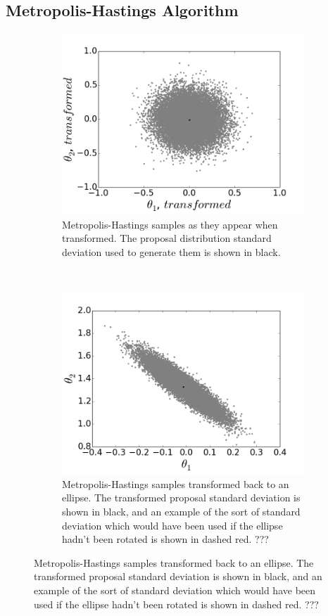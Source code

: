 \documentclass[a4paper,11pt,twoside]{article}
\begin{document}
\subsection{Metropolis-Hastings Algorithm} 
\begin{figure}[htb]
	\centering
	\begin{subfigure}[t]{0.4\linewidth}
		\centering
		\includegraphics[width=\textwidth]{rot.png}
		\caption{Metropolis-Hastings samples as they appear when
		transformed. The proposal distribution standard deviation used
		to generate them is shown in black.}
		\label{fig:rot}
	\end{subfigure}
	~
	\begin{subfigure}[t]{0.4\linewidth}
		\centering
		\includegraphics[width=\textwidth]{unrot.png}
		\caption{Metropolis-Hastings samples transformed back to
		an ellipse. The transformed proposal standard deviation is shown
		in black, and an example of the sort of standard deviation which would
		have been used if the ellipse hadn't been rotated is shown in dashed red. ??? }
		\label{fig:unrot}
	\end{subfigure}
	\label{fig:rot-unrot}
\end{figure}
\end{document}
